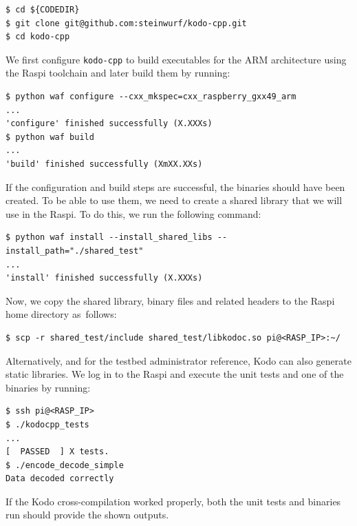 \documentclass[electronics,article,accept,moreauthors,pdftex,10pt,a4paper]{mdpi}
\theoremstyle{mdpi}
\newcounter{ex}
\newcounter{re}
\theoremstyle{mdpidefinition}
\begin{document}
\begin{lstlisting}[]
$ cd ${CODEDIR}
$ git clone git@github.com:steinwurf/kodo-cpp.git
$ cd kodo-cpp
\end{lstlisting}
\FloatBarrier
\vspace{-5mm}

We first configure \texttt{kodo-cpp} to build executables for the
ARM architecture using the Raspi toolchain and later build them
by running:
\begin{lstlisting}[]
$ python waf configure --cxx_mkspec=cxx_raspberry_gxx49_arm
...
'configure' finished successfully (X.XXXs)
$ python waf build
...
'build' finished successfully (XmXX.XXs)
\end{lstlisting}
\FloatBarrier
\vspace{-5mm}

If the configuration and build steps are successful, the binaries should
have been created. To be able to use them, we need to create a shared library
that we will use in the Raspi. To do this, we run the following command:

\begin{lstlisting}[]
$ python waf install --install_shared_libs --install_path="./shared_test"
...
'install' finished successfully (X.XXXs)
\end{lstlisting}
\FloatBarrier
\vspace{-5mm}

Now, we copy the shared library, binary files and related headers to the
Raspi home directory as~follows:

\begin{lstlisting}[]
$ scp -r shared_test/include shared_test/libkodoc.so pi@<RASP_IP>:~/
\end{lstlisting}
\FloatBarrier
\vspace{-5mm}

Alternatively, and for the testbed administrator reference, Kodo can also
generate static libraries. We log in to the Raspi and execute the unit
tests and one of the binaries by running:

\begin{lstlisting}[]
$ ssh pi@<RASP_IP>
$ ./kodocpp_tests
...
[  PASSED  ] X tests.
$ ./encode_decode_simple
Data decoded correctly
\end{lstlisting}
\FloatBarrier
\vspace{-5mm}

If the Kodo cross-compilation worked properly, both the unit tests and
binaries run should provide the shown outputs.
\end{document}
